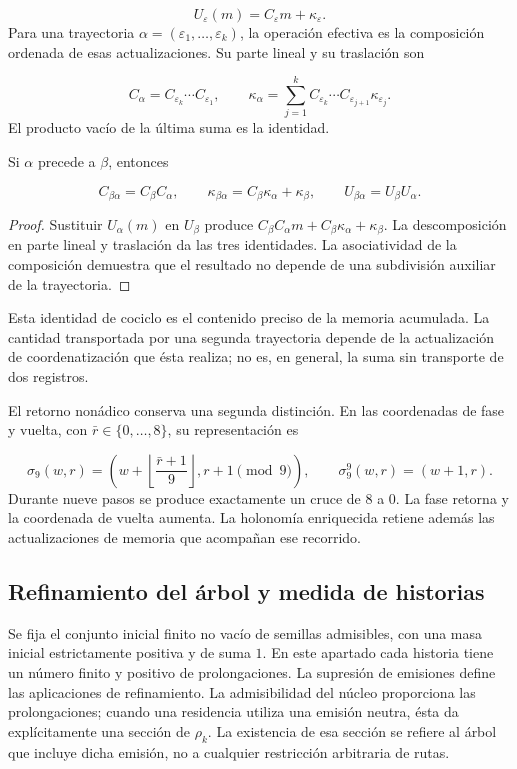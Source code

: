 \[
U_\varepsilon(m)=C_\varepsilon m+\kappa_\varepsilon.
\]
Para una trayectoria \(\alpha=(\varepsilon_1,\ldots,\varepsilon_k)\), la operación efectiva es la composición ordenada de esas actualizaciones. Su parte lineal y su traslación son

\[
C_\alpha=C_{\varepsilon_k}\cdots C_{\varepsilon_1},
\qquad
\kappa_\alpha=
\sum_{j=1}^{k}C_{\varepsilon_k}\cdots
C_{\varepsilon_{j+1}}\kappa_{\varepsilon_j}.
\]
El producto vacío de la última suma es la identidad.

\begin{proposition}
\label{iv:cont:concatenacion}
Si \(\alpha\) precede a \(\beta\), entonces

\[
C_{\beta\alpha}=C_\beta C_\alpha,
\qquad
\kappa_{\beta\alpha}=C_\beta\kappa_\alpha+\kappa_\beta,
\qquad
U_{\beta\alpha}=U_\beta U_\alpha.
\]
\end{proposition}
\begin{proof}
Sustituir \(U_\alpha(m)\) en \(U_\beta\) produce \(C_\beta C_\alpha m+C_\beta\kappa_\alpha+\kappa_\beta\). La descomposición en parte lineal y traslación da las tres identidades. La asociatividad de la composición demuestra que el resultado no depende de una subdivisión auxiliar de la trayectoria.
\end{proof}

Esta identidad de cociclo es el contenido preciso de la memoria acumulada. La cantidad transportada por una segunda trayectoria depende de la actualización de coordenatización que ésta realiza; no es, en general, la suma sin transporte de dos registros.

El retorno nonádico conserva una segunda distinción. En las coordenadas de fase y vuelta, con \(\bar r\in\{0,\ldots,8\}\), su representación es

\[
\sigma_9(w,r)=
\left(w+\left\lfloor\frac{\bar r+1}{9}\right\rfloor,
r+1\pmod9\right),
\qquad
\sigma_9^9(w,r)=(w+1,r).
\]
Durante nueve pasos se produce exactamente un cruce de \(8\) a \(0\). La fase retorna y la coordenada de vuelta aumenta. La holonomía enriquecida retiene además las actualizaciones de memoria que acompañan ese recorrido.

\subsection{Refinamiento del árbol y medida de historias}
\label{iv:cont:medida}
Se fija el conjunto inicial finito no vacío de semillas admisibles, con una masa inicial estrictamente positiva y de suma \(1\). En este apartado cada historia tiene un número finito y positivo de prolongaciones. La supresión de emisiones define las aplicaciones de refinamiento. La admisibilidad del núcleo proporciona las prolongaciones; cuando una residencia utiliza una emisión neutra, ésta da explícitamente una sección de \(\rho_k\). La existencia de esa sección se refiere al árbol que incluye dicha emisión, no a cualquier restricción arbitraria de rutas.

